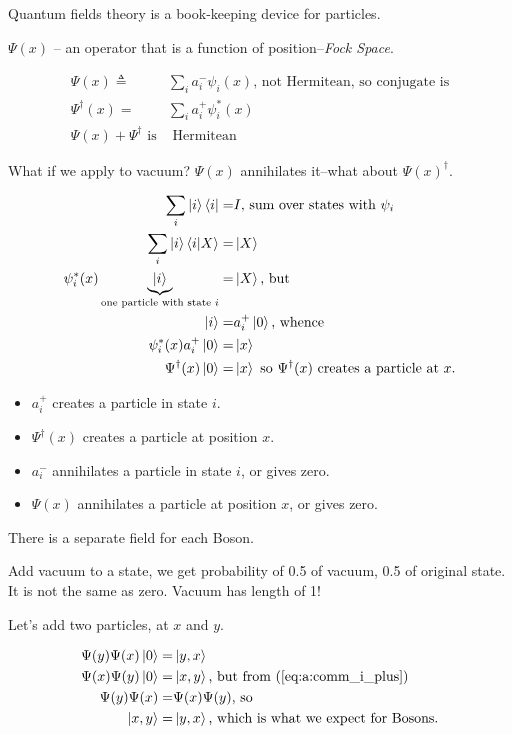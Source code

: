 \documentclass[]{article}
\begin{document}
Quantum fields theory is a book-keeping device for particles.

$\Psi(x)$ -- an operator that is a function of position--\emph{Fock Space}.

\begin{align*}
\Psi(x)\triangleq&\sum_{i}a^-_i\psi_i(x)\text{, not Hermitean, so conjugate is}\\
\Psi^\dagger(x)=&\sum_{i}a^+_i\psi_i^*(x)\\
\Psi(x)+\Psi^\dagger \text{ is}&\text{ Hermitean}
\end{align*}

What if we apply to vacuum? $\Psi(x)$ annihilates it--what about $\Psi(x)^\dagger$.

\begin{align*}
\sum_{i} \ket{i} \bra{i} =& I \text{, sum over states with $\psi_i$}\\
\sum_{i} \ket{i} \braket{i|X} =& \ket{X}\\
\psi^*_i(x)\underbrace{\ket{i}}_\text{one particle with state $i$} =& \ket{X}\text{, but}\\
\ket{i} =& a^+_i\ket{0} \text{, whence}\\
\psi^*_i(x) a^+_i\ket{0}=&\ket{x}\\
\Psi^\dagger(x) \ket{0} =& \ket{x}\text{ so $\Psi^\dagger(x)$ creates a particle at $x$.}
\end{align*}

\begin{itemize}
	\item $a^+_i$ creates a particle in state $i$.
	\item $\Psi^\dagger(x)$  creates a particle at position $x$.
	\item $a^-_i$ annihilates a particle in state $i$, or gives zero.
	\item $\Psi(x)$  annihilates a particle at position $x$, or gives zero.
\end{itemize}

There is a separate field for each Boson.

Add vacuum to a state, we get probability of 0.5 of vacuum, 0.5 of original state. It is not the same as zero. Vacuum has length of 1!

Let's add two particles, at $x$ and $y$. 
 
\begin{align*}
\Psi(y)\Psi(x)\ket{0} =& \ket{y,x}\\
\Psi(x)\Psi(y)\ket{0} =& \ket{x,y} \text{, but from (\ref {eq:a:comm_i_plus})}\\
\Psi(y)\Psi(x) =& \Psi(x)\Psi(y) \text{, so}\\
\ket{x,y} =& \ket{y,x} \text{, which is what we expect for Bosons.} 
\end{align*}
\end{document}
